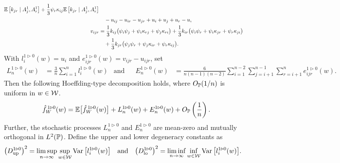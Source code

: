 \begin{lemma}
\begin{align*}
    \E\left[
      k_{jr}
    \mid A_j^1, A_r^1 \right]
    +
    \frac{1}{3}
    \psi_r \kappa_{i j}
    \E\left[
      k_{jr}
    \mid A_j^1, A_r^1 \right] \\
    &\quad-
    u_{i j} - u_{i r} - u_{jr}
    + u_i + u_j + u_r
    - u, \\
    v_{i j r}
    &=
    \frac{1}{3}
    k_{i j} \big(\psi_i \psi_j +\psi_i \kappa_{r j} +\psi_j \kappa_{r i} \big)
    + \frac{1}{3}
    k_{i r} \big(\psi_i \psi_r +\psi_i \kappa_{jr} +\psi_r \kappa_{j i} \big) \\
    &\quad+
    \frac{1}{3}
    k_{jr} \big(\psi_j \psi_r +\psi_j \kappa_{i r} +\psi_r \kappa_{i j} \big).
  \end{align*}
  With $l_i^{1 \triangleright 0}(w) = u_i$
  and $e_{i j r}^{1 \triangleright 0}(w) = v_{i j r} - u_{i j r}$,
  set
  \begin{align*}
    L_n^{1 \triangleright 0}(w)
    &=
    \frac{3}{n} \sum_{i=1}^n
    l_i^{1 \triangleright 0}(w)
    &\text{and}                 &
    &E_n^{1 \triangleright 0}(w)
    &=
    \frac{6}{n(n-1)(n-2)}
    \sum_{i=1}^{n-2}
    \sum_{j=i+1}^{n-1}
    \sum_{r=i+1}^n
    e_{i j r}^{1 \triangleright 0}(w).
  \end{align*}
  Then the following Hoeffding-type decomposition holds,
  where $O_\P(1/n)$ is uniform in $w \in \cW$.
  \begin{align*}
    \hat f_W^{\,1 \triangleright 0}(w)
    = \E\big[\hat f_W^{\,1 \triangleright 0}(w)\big]
    + L_n^{1 \triangleright 0}(w)
    + E_n^{1 \triangleright 0}(w)
    + O_\P\left( \frac{1}{n} \right).
  \end{align*}
  Further,
  the stochastic processes
  $L_n^{1 \triangleright 0}$
  and $E_n^{1 \triangleright 0}$
  are mean-zero
  and mutually orthogonal
  in $L^2(\P)$.
  Define the upper and lower degeneracy constants as
  \begin{align*}
    \left(
      \Du^{1 \triangleright 0}
    \right)^2
    &=
    \limsup_{n \to \infty}
    \sup_{w \in \cW}
    \Var\big[
      l_i^{1 \triangleright 0}(w)
    \big]
    &\text{and}&
    &
    \left(
      \Dl^{1 \triangleright 0}
    \right)^2
    &=
    \liminf_{n \to \infty}
    \inf_{w \in \cW}
    \Var\big[
      l_i^{1 \triangleright 0}(w)
    \big].
  \end{align*}

\end{lemma}

